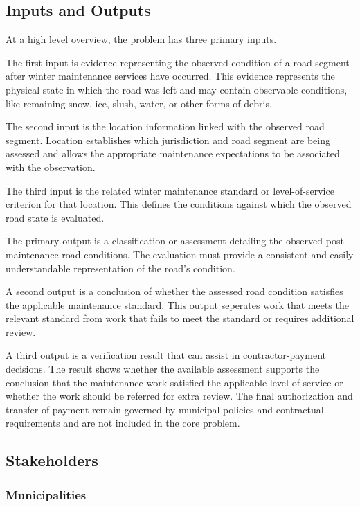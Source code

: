 \documentclass{article}
\begin{document}
\subsection{Inputs and Outputs}

At a high level overview, the problem has three primary inputs.

The first input is evidence representing the observed condition of a road
segment after winter maintenance services have occurred. This evidence
represents the physical state in which the road was left and may contain
observable conditions, like remaining snow, ice, slush, water, or other forms
of debris.

The second input is the location information linked with the observed road
segment. Location establishes which jurisdiction and road segment are being
assessed and allows the appropriate maintenance expectations to be associated
with the observation.

The third input is the related winter maintenance standard or
level-of-service criterion for that location. This defines the conditions
against which the observed road state is evaluated.

The primary output is a classification or assessment detailing the observed
post-maintenance road conditions. The evaluation must provide a consistent and
easily understandable representation of the road's condition.

A second output is a conclusion of whether the assessed road condition
satisfies the applicable maintenance standard. This output seperates work
that meets the relevant standard from work that fails to meet the standard or
requires additional review.

A third output is a verification result that can assist in contractor-payment
decisions. The result shows whether the available assessment supports the
conclusion that the maintenance work satisfied the applicable level of service or
whether the work should be referred for extra review. The final authorization
and transfer of payment remain governed by municipal policies and contractual
requirements and are not included in the core problem.

\subsection{Stakeholders}

\subsubsection{Municipalities}
\end{document}
